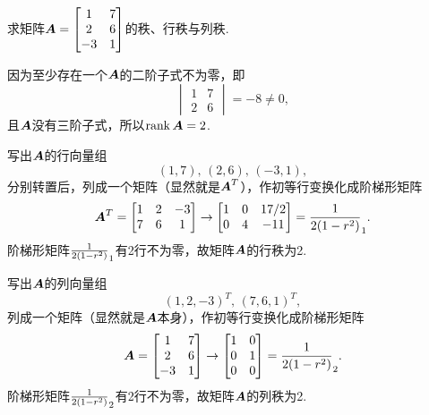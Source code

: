 \begin{example}
求矩阵\(\boldsymbol{A} = \begin{bmatrix} 1 & 7 \\ 2 & 6 \\ -3 & 1 \end{bmatrix}\)的秩、行秩与列秩.
\begin{solution}
因为至少存在一个\(\boldsymbol{A}\)的二阶子式不为零，即\[
\begin{vmatrix} 1 & 7 \\ 2 & 6 \end{vmatrix} = -8 \neq 0,
\]且\(\boldsymbol{A}\)没有三阶子式，所以\(\rank\boldsymbol{A} = 2\).

写出\(\boldsymbol{A}\)的行向量组\[
(1,7),\,(2,6),\,(-3,1),
\]分别转置后，列成一个矩阵（显然就是\(\boldsymbol{A}^T\)），作初等行变换化成阶梯形矩阵\[
\boldsymbol{A}^T = \begin{bmatrix}
1 & 2 & -3 \\
7 & 6 & 1
\end{bmatrix} \to \begin{bmatrix}
1 & 0 & 17/2 \\
0 & 4 & -11
\end{bmatrix} = \frac{1}{2(1-r^2)}_1.
\]阶梯形矩阵\(\frac{1}{2(1-r^2)}_1\)有2行不为零，故矩阵\(\boldsymbol{A}\)的行秩为2.

写出\(\boldsymbol{A}\)的列向量组\[
(1,2,-3)^T,\,(7,6,1)^T,
\]列成一个矩阵（显然就是\(\boldsymbol{A}\)本身），作初等行变换化成阶梯形矩阵\[
\boldsymbol{A} = \begin{bmatrix} 1 & 7 \\ 2 & 6 \\ -3 & 1 \end{bmatrix}
\to \begin{bmatrix} 1 & 0 \\ 0 & 1 \\ 0 & 0 \end{bmatrix} = \frac{1}{2(1-r^2)}_2.
\]阶梯形矩阵\(\frac{1}{2(1-r^2)}_2\)有2行不为零，故矩阵\(\boldsymbol{A}\)的列秩为2.
\end{solution}
\end{example}

